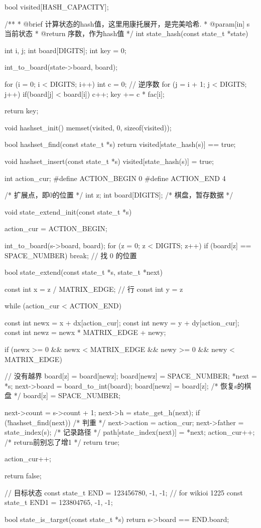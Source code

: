 \begin{Codex}[label=eight_digits_astar.c]
bool visited[HASH_CAPACITY];

/**
 * @brief 计算状态的hash值，这里用康托展开，是完美哈希.
 * @param[in] s 当前状态
 * @return 序数，作为hash值
 */
int state_hash(const state_t *state) {
    int i, j;
    int board[DIGITS];
    int key = 0;

    int_to_board(state->board, board);

    for (i = 0; i < DIGITS; i++) {
        int c = 0; // 逆序数
        for (j = i + 1; j < DIGITS; j++) {
            if(board[j] < board[i]) {
                c++;
            }
        }
        key += c * fac[i];
    }

    return key;
}

void hashset_init() {
    memset(visited, 0, sizeof(visited));
}

bool hashset_find(const state_t *s) {
    return visited[state_hash(s)] == true;
}

void hashset_insert(const state_t *s) {
    visited[state_hash(s)] = true;
}

int action_cur;
#define ACTION_BEGIN 0
#define ACTION_END 4

/* 扩展点，即0的位置 */
int z;
int board[DIGITS];  /* 棋盘，暂存数据 */

void state_extend_init(const state_t *s) {
    action_cur = ACTION_BEGIN;

    int_to_board(s->board, board);
    for (z = 0; z < DIGITS; z++) {
        if (board[z] == SPACE_NUMBER) {
            break;  // 找 0 的位置
        }
    }
}

bool state_extend(const state_t *s, state_t *next) {
    const int x = z / MATRIX_EDGE; // 行
    const int y = z %

    while (action_cur < ACTION_END) {
        const int newx = x + dx[action_cur];
        const int newy = y + dy[action_cur];
        const int newz = newx * MATRIX_EDGE + newy;

        if (newx >= 0 && newx < MATRIX_EDGE && newy >= 0 &&
                newy < MATRIX_EDGE) { // 没有越界
            board[z] = board[newz];
            board[newz] = SPACE_NUMBER;
            *next = *s;
            next->board = board_to_int(board);
            board[newz] = board[z]; /* 恢复s的棋盘 */
            board[z] = SPACE_NUMBER;

            next->count = s->count + 1;
            next->h = state_get_h(next);
            if (!hashset_find(next)) { /* 判重 */
                next->action = action_cur;
                next->father = state_index(s);
                /* 记录路径 */
                path[state_index(next)] = *next;
                action_cur++; /* return前别忘了增1 */
                return true;
            }
        }
        action_cur++;
    }
    return false;
}

// 目标状态
const state_t END = {123456780, -1, -1};
// for wikioi 1225
const state_t END1 = {123804765, -1, -1};

bool state_is_target(const state_t *s) {
    return s->board == END.board;
}
\end{Codex}
